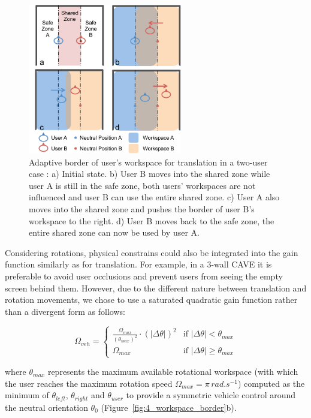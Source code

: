 \begin{figure}[tb]
\begin{center}
\includegraphics[width=0.6\textwidth]{figures/ch4/adaptive_trans_border}
\end{center}
\caption{\label{fig:4_adaptive_trans_border}Adaptive border of user's workspace for translation in a two-user case : a) Initial state. b) User B moves into the shared zone while user A is still in the safe zone, both users' workspaces are not influenced and user B can use the entire shared zone. c) User A also moves into the shared zone and pushes the border of user B's workspace to the right. d) User B moves back to the safe zone, the entire shared zone can now be used by user A.}
\end{figure}

Considering rotations, physical constrains could also be integrated into the gain function similarly as for translation. For example, in a 3-wall CAVE it is preferable to avoid user occlusions and prevent users from seeing the empty screen behind them. However, due to the different nature between translation and rotation movements, we chose to use a saturated quadratic gain function rather than a divergent form as follows:

\begin{equation}
\Omega_{veh}=
  \begin{cases}
    \frac{\Omega_{max}}{(\theta_{max})^{2}}\cdot(|\Delta\theta|)^{2} & \text{if } |\Delta\theta|<\theta_{max} \\
    \Omega_{max} & \text{if } |\Delta\theta| \geq \theta_{max}
  \end{cases}
\end{equation}

where $\theta_{max}$ represents the maximum available rotational workspace (with which the user reaches the maximum rotation speed $\Omega_{max}=\pi\, rad.s^{-1}$) computed as the minimum of $\theta_{left}$, $\theta_{right}$ and $\theta_{user}$ to provide a symmetric vehicle control around the neutral orientation $\theta_{0}$ (Figure~\ref{fig:4_workspace_border}b).  



